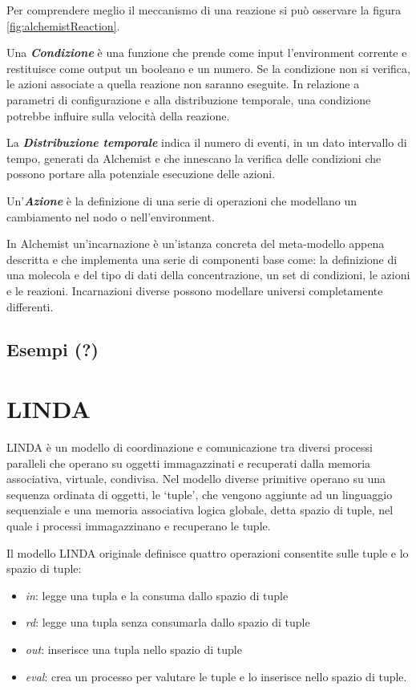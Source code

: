 Per comprendere meglio il meccanismo di una reazione si pu\`o osservare la figura \ref{fig:alchemistReaction}.

Una \textbf{\textit{Condizione}} \`e una funzione che prende come input l'environment corrente e restituisce come output un booleano e un numero. Se la condizione non si verifica, le azioni associate a quella reazione non saranno eseguite. In relazione a parametri di configurazione e alla distribuzione temporale, una condizione potrebbe influire sulla velocit\`a della reazione.

La \textbf{\textit{Distribuzione temporale}} indica il numero di eventi, in un dato intervallo di tempo, generati da Alchemist e che innescano la verifica delle condizioni che possono portare alla potenziale esecuzione delle azioni.

Un'\textbf{\textit{Azione}} \`e la definizione di una serie di operazioni che modellano un cambiamento nel nodo o nell'environment.

In Alchemist un'incarnazione \`e un'istanza concreta del meta-modello appena descritta e che implementa una serie di componenti base come: la definizione di una molecola e del tipo di dati della concentrazione, un set di condizioni, le azioni e le reazioni. Incarnazioni diverse possono modellare universi completamente differenti.

\subsection{Esempi (?)}


\section{LINDA}
LINDA \`e un modello di coordinazione e comunicazione tra diversi processi paralleli che operano su oggetti immagazzinati e recuperati dalla memoria associativa, virtuale, condivisa. Nel modello diverse primitive operano su una sequenza ordinata di oggetti, le `tuple', che vengono aggiunte ad un linguaggio sequenziale e una memoria associativa logica globale, detta spazio di tuple, nel quale i processi immagazzinano e recuperano le tuple.

Il modello LINDA originale definisce quattro operazioni consentite sulle tuple e lo spazio di tuple:
\begin{itemize}
\item \textit{in}: legge una tupla e la consuma dallo spazio di tuple
\item \textit{rd}: legge una tupla senza consumarla dallo spazio di tuple
\item \textit{out}: inserisce una tupla nello spazio di tuple
\item \textit{eval}: crea un processo per valutare le tuple e lo inserisce nello spazio di tuple.
\end{itemize}

